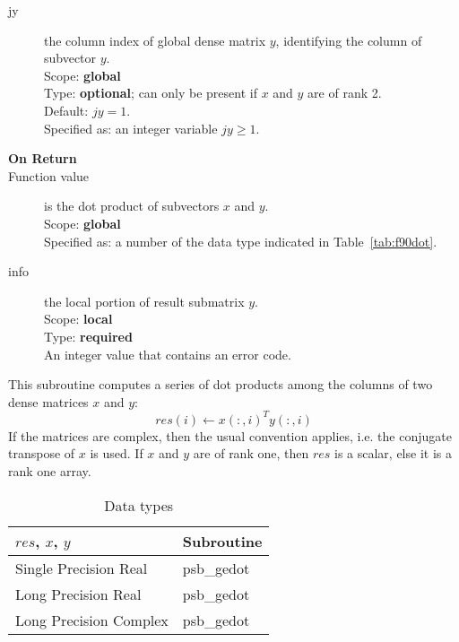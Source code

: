 \begin{description}
\item[jy]  the column index of global dense matrix $y$,
identifying the column of subvector $y$.\\
Scope: {\bf global} \\
Type: {\bf optional}; can only be present if $x$ and $y$ are of rank 2.\\
Default: $jy = 1$.\\
Specified as: an integer variable $jy\ge 1$. 
\item[\bf On Return] 
\item[Function value] is the dot product of subvectors $x$ and $y$.\\
Scope: {\bf global} \\
Specified as: a number of the data type indicated in Table~\ref{tab:f90dot}.
\item[info] the local portion of result submatrix $y$.\\
Scope: {\bf local} \\
Type: {\bf required} \\
An integer value that contains an error code. 
\end{description}
%
%


This subroutine computes a series of  dot products among the columns of
two dense matrices  $x$ and $y$: 
\[ res(i) \leftarrow x(:,i)^T y(:,i)\]
If the matrices are complex, then the
usual convention applies, i.e. the conjugate transpose of $x$ is
used. If $x$ and $y$ are of rank one, then $res$ is a scalar, else it
is a rank one array. 

\begin{table}[h]
\begin{center}
\begin{tabular}{ll}
\hline
$res$, $x$, $y$ & {\bf Subroutine}\\
\hline
Single Precision Real & psb\_gedot\\
Long Precision Real & psb\_gedot \\
Long Precision Complex & psb\_gedot \\	
\hline
\end{tabular}
\end{center}
\caption{Data types\label{tab:f90mdot}}
\end{table}

